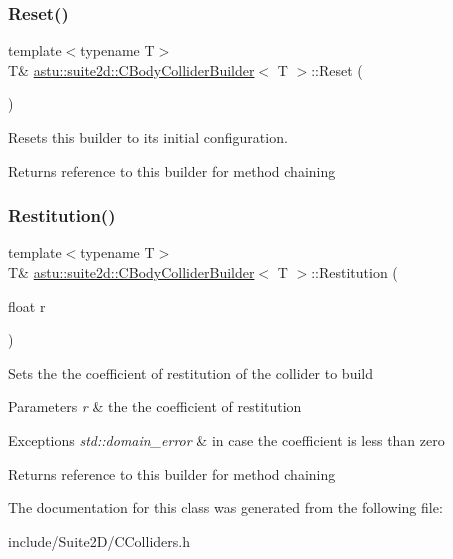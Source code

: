 \subsubsection{\texorpdfstring{Reset()}{Reset()}}
{\footnotesize\ttfamily template$<$typename T$>$ \\
T\& \hyperlink{classastu_1_1suite2d_1_1CBodyColliderBuilder}{astu\+::suite2d\+::\+C\+Body\+Collider\+Builder}$<$ T $>$\+::Reset (\begin{DoxyParamCaption}{ }\end{DoxyParamCaption})\hspace{0.3cm}{\ttfamily [inline]}}

Resets this builder to its initial configuration.

\begin{DoxyReturn}{Returns}
reference to this builder for method chaining 
\end{DoxyReturn}
\mbox{\label{classastu_1_1suite2d_1_1CBodyColliderBuilder_ac65b06a13c81a76e0aefbefd90993ba6}} 
\subsubsection{\texorpdfstring{Restitution()}{Restitution()}}
{\footnotesize\ttfamily template$<$typename T$>$ \\
T\& \hyperlink{classastu_1_1suite2d_1_1CBodyColliderBuilder}{astu\+::suite2d\+::\+C\+Body\+Collider\+Builder}$<$ T $>$\+::Restitution (\begin{DoxyParamCaption}\item[{float}]{r }\end{DoxyParamCaption})\hspace{0.3cm}{\ttfamily [inline]}}

Sets the the coefficient of restitution of the collider to build


\begin{DoxyParams}{Parameters}
{\em r} & the the coefficient of restitution \\
\hline
\end{DoxyParams}

\begin{DoxyExceptions}{Exceptions}
{\em std\+::domain\+\_\+error} & in case the coefficient is less than zero \\
\hline
\end{DoxyExceptions}
\begin{DoxyReturn}{Returns}
reference to this builder for method chaining 
\end{DoxyReturn}


The documentation for this class was generated from the following file\+:\begin{DoxyCompactItemize}
\item 
include/\+Suite2\+D/C\+Colliders.\+h\end{DoxyCompactItemize}
